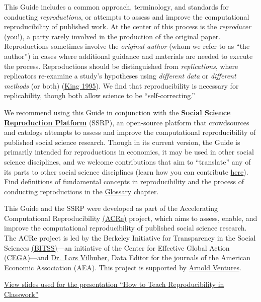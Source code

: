 \documentclass[
  openany]{book}
\begin{document}
This Guide includes a common approach, terminology, and standards for conducting \emph{reproductions}, or attempts to assess and improve the computational reproducibility of published work. At the center of this process is the \emph{reproducer} (you!), a party rarely involved in the production of the original paper. Reproductions sometimes involve the \emph{original author} (whom we refer to as ``the author'') in cases where additional guidance and materials are needed to execute the process. Reproductions should be distinguished from \emph{replications}, where replicators re-examine a study's hypotheses using \emph{different data} or \emph{different methods} (or both) (\protect\hyperlink{ref-King95}{King 1995}). We find that reproducibility is necessary for replicability, though both allow science to be ``self-correcting.''

We recommend using this Guide in conjunction with the \href{https://www.socialsciencereproduction.org/}{\textbf{Social Science Reproduction Platform}} (SSRP), an open-source platform that crowdsources and catalogs attempts to assess and improve the computational reproducibility of published social science research. Though in its current version, the Guide is primarily intended for reproductions in economics, it may be used in other social science disciplines, and we welcome contributions that aim to ``translate'' any of its parts to other social science disciplines (learn how you can contribute \href{https://bitss.github.io/ACRE/contributions.html}{here}). Find definitions of fundamental concepts in reproducibility and the process of conducting reproductions in the \href{https://bitss.github.io/ACRE/definitions.html}{Glossary} chapter.

This Guide and the SSRP were developed as part of the Accelerating Computational Reproducibility \href{https://www.bitss.org/ecosystem/acre/}{(ACRe)} project, which aims to assess, enable, and improve the computational reproducibility of published social science research. The ACRe project is led by the Berkeley Initiative for Transparency in the Social Sciences \href{https://bitss.org}{(BITSS)}---an initiative of the Center for Effective Global Action \href{https://cega.berkeley.edu/}{(CEGA)}---and \href{https://www.vilhuber.com/lars/}{Dr.~Lars Vilhuber}, Data Editor for the journals of the American Economic Association (AEA). This project is supported by \href{https://www.arnoldventures.org/}{Arnold Ventures}.

\href{https://bitss.github.io/WEAI2020_slides/}{View slides used for the presentation ``How to Teach Reproducibility in Classwork''}
\end{document}
